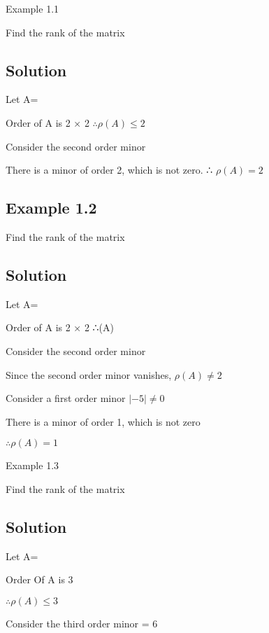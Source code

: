 \documentclass[12pt, a4paper]{article}
\begin{document}
Example 1.1

Find the rank of the matrix 

\bigskip \subsection*{Solution}

Let A= 

Order of A is 2 × 2 $\therefore          \rho(A)\leq 2$

Consider the second order minor



There is a minor of order 2, which is not zero. ∴ $\rho (A) = 2$

\newpage 
\subsection*{Example 1.2}

Find the rank of the matrix 

\bigskip \subsection*{Solution}

Let A= 

Order of A is 2 × 2 ∴\rho(A)

Consider the second order minor



Since the second order minor vanishes, $\rho(A) \neq  2$

Consider a first order minor $|−5| \neq  0$

There is a minor of order 1, which is not zero

$\therefore \rho (A) = 1$

\newpage  

Example 1.3

Find the rank of the matrix 

\bigskip \subsection*{Solution}

Let A= 

Order Of A is 3 

$\therefore \rho (A) \leq 3$

Consider the third order minor  = 6 
\end{document}
